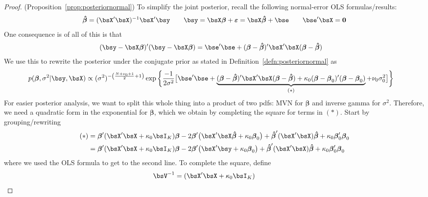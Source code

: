 \documentclass[12pt]{article}
\theoremstyle{plain}
\theoremstyle{definition}
\theoremstyle{remark}
\newcommand{\bsvarepsilon}{\boldsymbol{\varepsilon}}
\newcommand{\bsbeta}{\boldsymbol{\beta}}
\newcommand{\bshatbeta}{\boldsymbol{\hat{\beta}}}
\renewcommand{\bso}{\boldsymbol{0}}
\begin{document}
\clearpage
\begin{proof}(Proposition~\ref{prop:posteriornormal})
To simplify the joint posterior, recall the following normal-error OLS
formulas/results:
\begin{align*}
  \bshatbeta=(\bsX'\bsX)^{-1}\bsX'\bsy
  \qquad
  \bsy
  = \bsX\bsbeta + \bsvarepsilon
  = \bsX\bshatbeta + \bse
  \qquad
  \bse'\bsX = \bso
\end{align*}
One consequence is of all of this is that
\begin{align*}
  (\bsy-\bsX\bsbeta)'
  (\bsy-\bsX\bsbeta)
  &=
  \bse'\bse
  + (\bsbeta-\bshatbeta)'\bsX'\bsX(\bsbeta-\bshatbeta)
\end{align*}
We use this to rewrite the posterior under the conjugate prior as stated
in Definition~\ref{defn:posteriornormal} as
\begin{align*}
  p(\bsbeta, \sigma^2 | \bsy,\bsX)
  &\propto
  (\sigma^2)^{-\left(\frac{N+\nu_0+1}{2}+1\right)}
  \exp\bigg\{%
    \frac{-1}{2\sigma^2}
    \big[
    \bse'\bse
    +
    \underbrace{
    (\bsbeta-\bshatbeta)'\bsX'\bsX(\bsbeta-\bshatbeta)
    + \kappa_0(\bsbeta-\bsbeta_0)'(\bsbeta-\bsbeta_0)
    }_{(*)}
    +\nu_0\sigma^2_0
    \big]
  \bigg\}
\end{align*}
For easier posterior analysis, we want to split this whole thing into a
product of two pdfs: MVN for $\bsbeta$ and inverse gamma for $\sigma^2$.
Therefore, we need a quadratic form in the exponential for $\bsbeta$,
which we obtain by completing the square for terms in $(*)$.  Start by
grouping/rewriting
\begin{align*}
  (*)
  &=
  \bsbeta'(\bsX'\bsX+\kappa_0\bsI_K)\bsbeta
  - 2\bsbeta'\big(\bsX'\bsX\bshatbeta + \kappa_0\bsbeta_0\big)
  + \bshatbeta'(\bsX'\bsX)\bshatbeta
  + \kappa_0 \bsbeta_0'\bsbeta_0
  \\
  &=
  \bsbeta'(\bsX'\bsX+\kappa_0\bsI_K)\bsbeta
  - 2\bsbeta'\big(\bsX'\bsy + \kappa_0\bsbeta_0\big)
  + \bshatbeta'(\bsX'\bsX)\bshatbeta
  + \kappa_0 \bsbeta_0'\bsbeta_0
\end{align*}
where we used the OLS formula to get to the second line.
To complete the square, define
\begin{align*}
  \bsV^{-1}=(\bsX'\bsX+\kappa_0\bsI_K)
  \qquad\quad

\end{align*}
\end{proof}
\end{document}
